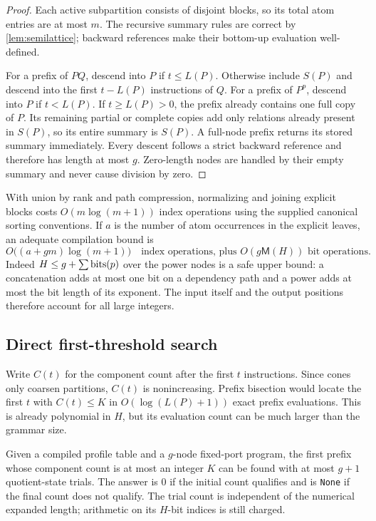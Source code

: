 \begin{proof}
Each active subpartition consists of disjoint blocks, so its total atom
entries are at most $m$. The recursive summary rules are correct by
\cref{lem:semilattice}; backward references make their bottom-up evaluation
well-defined.

For a prefix of $PQ$, descend into $P$ if $t\le L(P)$. Otherwise include
$S(P)$ and descend into the first $t-L(P)$ instructions of $Q$. For a
prefix of $P^p$, descend into $P$ if $t<L(P)$. If $t\ge L(P)>0$, the prefix
already contains one full copy of $P$. Its remaining partial or complete
copies add only relations already present in $S(P)$, so its entire summary
is $S(P)$. A full-node prefix returns its stored summary immediately.
Every descent follows a strict backward reference and therefore has length
at most $g$. Zero-length nodes are handled by their empty summary and never
cause division by zero.
\end{proof}

With union by rank and path compression, normalizing and joining explicit
blocks costs $O(m\log(m+1))$ index operations using the supplied canonical
sorting conventions. If $a$ is the number of atom occurrences in the
explicit leaves, an adequate compilation bound is
\[
 O\bigl((a+gm)\log(m+1)\bigr)
 \quad\text{index operations, plus }O(g\mathsf M(H))\text{ bit operations}.
\]
Indeed $H\le g+\sum\operatorname{bits}(p)$ over the power nodes is a safe upper bound:
a concatenation adds at most one bit on a dependency path and a power adds
at most the bit length of its exponent. The input itself and the output
positions therefore account for all large integers.

\subsection{Direct first-threshold search}

Write $C(t)$ for the component count after the first $t$ instructions.
Since cones only coarsen partitions, $C(t)$ is nonincreasing. Prefix
bisection would locate the first $t$ with $C(t)\le K$ in
$O(\log(L(P)+1))$ exact prefix evaluations. This is already polynomial in
$H$, but its evaluation count can be much larger than the grammar size.

\begin{theorem}
\label{thm:threshold}
Given a compiled profile table and a $g$-node fixed-port program, the first
prefix whose component count is at most an integer $K$ can be found with
at most $g+1$ quotient-state trials. The answer is $0$ if the initial count
qualifies and is \texttt{None} if the final count does not qualify.
The trial count is independent of the numerical expanded length; arithmetic
on its $H$-bit indices is still charged.
\end{theorem}


